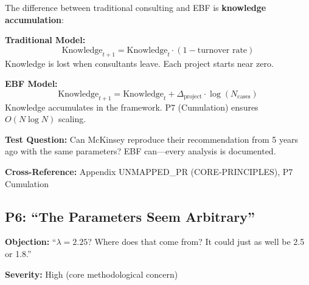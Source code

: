 \begin{axiom}
The difference between traditional consulting and EBF is \textbf{knowledge accumulation}:

\textbf{Traditional Model:}
\begin{equation}
\text{Knowledge}_{t+1} = \text{Knowledge}_t \cdot (1 - \text{turnover rate})
\end{equation}
Knowledge is lost when consultants leave. Each project starts near zero.

\textbf{EBF Model:}
\begin{equation}
\text{Knowledge}_{t+1} = \text{Knowledge}_t + \Delta_{\text{project}} \cdot \log(N_{\text{cases}})
\end{equation}
Knowledge accumulates in the framework. P7 (Cumulation) ensures $O(N \log N)$ scaling.

\textbf{Test Question:} Can McKinsey reproduce their recommendation from 5 years ago
with the same parameters? EBF can---every analysis is documented.
\end{axiom}

\textbf{Cross-Reference:} Appendix UNMAPPED_PR (CORE-PRINCIPLES), P7 Cumulation

\subsection{P6: ``The Parameters Seem Arbitrary''}
\label{sec:da-p6}

\begin{tcolorbox}[colback=gray!5!white, colframe=gray!75!black]
\textbf{Objection:} ``$\lambda = 2.25$? Where does that come from?
It could just as well be 2.5 or 1.8.''

\textbf{Severity:} High (core methodological concern)
\end{tcolorbox}

